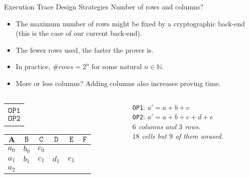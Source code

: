 \begin{frame}[allowframebreaks]{Execution Trace Design Strategies}
Number of rows and columns?

\vspace{0.25cm}
\begin{itemize}
\item The maximum number of rows might be fixed by a cryptographic back-end
(this is the case of our current back-end).
\item The fewer rows used, the faster the prover is.
\item In practice, $\# rows=2^n$ for some natural $n \in \mathbb{N}$.
\item More or less columns?  Adding columns also increases proving time.
\end{itemize}


\framebreak
\begin{columns}
\begin{column}{0.48\textwidth}
\begin{table}[h!]
\begin{tabular}{c}
$             $ \\
$\mathtt{OP1}$ \\
$\mathtt{OP2}$ \\
$             $
\end{tabular}
\begin{tabular}{|c|c|c|c|c|c|}\hline
$\mathbf{A}$ & $\mathtt{B}$ & $\mathtt{C}$ & $\mathtt{D}$ & $\mathtt{E}$ & $\mathtt{F}$ \\ \hline
$a_0$ & $b_0$ & $c_0$ & \cellcolor{cyan} & \cellcolor{cyan} & \cellcolor{cyan} \\ \hline
$a_1$ & $b_1$ & $c_1$ & $d_1$ & $e_1$ & \cellcolor{cyan} \\ \hline
\cellcolor{green} $a_2$ & \cellcolor{cyan} & \cellcolor{cyan} & \cellcolor{cyan} & \cellcolor{cyan} & \cellcolor{cyan} \\ \hline
\end{tabular}
\end{table}
\vspace{0.3cm}
\end{column}
\begin{column}{0.48\textwidth}
\texttt{OP1}: $a'=a+b+c$
\\ \texttt{OP2}: $a'=a+b+c+d+e$
\\ \textit{$6$ columns and $3$ rows.}
\\ \textit{$18$ cells but $9$ of them unused.}
\end{column}
\end{columns}
\begin{columns}
\begin{column}{0.48\textwidth}


\end{column}
\end{columns}
\end{frame}
